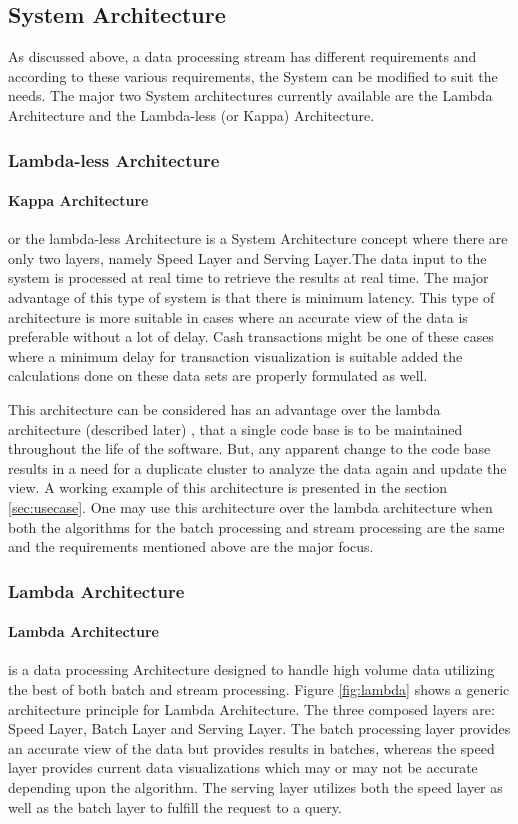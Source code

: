 \documentclass[runningheads,a4paper]{llncs}[2015/06/24]
\begin{document}
\subsection{System Architecture}
As discussed above, a data processing stream has different requirements and according to these various requirements, the System can be modified to suit the needs. The major two System architectures currently available are the Lambda Architecture and the Lambda-less (or Kappa) Architecture.

\subsubsection{Lambda-less Architecture}
\paragraph{Kappa Architecture} or the lambda-less Architecture is a System Architecture concept where there are only two layers, namely Speed Layer and Serving Layer.The data input to the system is processed at real time to retrieve the results at real time. The major advantage of this type of system is that there is minimum latency. This type of architecture is more suitable in cases where an accurate view of the data is preferable without a lot of delay. Cash transactions might be one of these cases where a minimum delay for transaction visualization is suitable added the calculations done on these data sets are properly formulated as well.

This architecture can be considered has an advantage over the lambda architecture (described later) , that a single code base is to be maintained throughout the life of the software. But, any apparent change to the code base results in a need for a duplicate cluster to analyze the data again and update the view. A working example of this architecture is presented in the section \ref{sec:usecase}. One may use this architecture over the lambda architecture when both the algorithms for the batch processing and stream processing are the same and the requirements mentioned above are the major focus.

\subsubsection{Lambda Architecture}
\paragraph{Lambda Architecture} is a data processing Architecture designed to handle high volume data utilizing the best of both batch and stream processing. Figure \ref{fig:lambda} shows a generic architecture principle for Lambda Architecture. The three composed layers are: Speed Layer, Batch Layer and Serving Layer. The batch processing layer provides an accurate view of the data but provides results in batches, whereas the speed layer provides current data visualizations which may or may not be accurate depending upon the algorithm. The serving layer utilizes both the speed layer as well as the batch layer to fulfill the request to a query.
\end{document}
